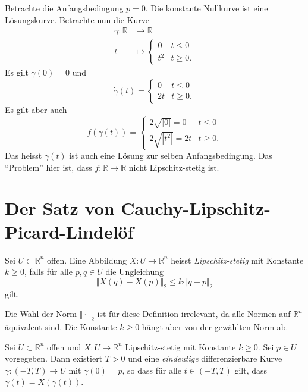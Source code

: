 \documentclass[../main.tex]{subfiles}
\begin{document}
\begin{examples}
\begin{enumerate}[(1)]
      Betrachte die Anfangsbedingung $p = 0$.
      Die konstante Nullkurve ist
      eine Lösungskurve.
      Betrachte nun die Kurve
      \begin{align*}
        \gamma \colon \mathbb{R} & \to \mathbb{R} \\
        t & \mapsto 
        \begin{cases}
          0 & t \leq 0 \\
          t^2 & t \geq 0.
        \end{cases}
      \end{align*}
      Es gilt $\gamma(0) = 0$ und
      \[
        \dot \gamma(t) =
        \begin{cases}
          0 & t \leq 0 \\
          2t & t \geq 0.
        \end{cases}
      \]
      Es gilt aber auch
      \[
        f(\gamma(t)) =
        \begin{cases}
          2 \sqrt{|0|} = 0 & t \leq 0 \\
          2 \sqrt{|t^2|} = 2t & t \geq 0.
        \end{cases}
      \]
      Das heisst $\gamma(t)$ ist auch eine Lösung
      zur selben Anfangsbedingung.
      Das ``Problem'' hier ist,
      dass $f \colon \mathbb{R} \to \mathbb{R}$ 
      nicht Lipschitz-stetig ist.
  \end{enumerate}
\end{examples}

\section{Der Satz von Cauchy-Lipschitz-Picard-Lindelöf}
\begin{definition}
  Sei $U \subset \mathbb{R}^n$ offen.
  Eine Abbildung $X \colon U \to \mathbb{R}^n$ 
  heisst \emph{Lipschitz-stetig} mit Konstante
  $k \geq 0$, falls für alle $p, q \in U$ 
  die Ungleichung
  \[
    \Vert X(q) - X(p) \Vert_2 \leq k \cdot \Vert q - p \Vert_2
  \]
  gilt.
\end{definition}

\begin{remark}
  Die Wahl der Norm $\Vert \cdot \Vert_2$ ist für diese
  Definition irrelevant,
  da alle Normen auf $\mathbb{R}^n$ äquivalent sind.
  Die Konstante $k \geq 0$ hängt aber von der gewählten
  Norm ab.
\end{remark}

\begin{theorem*}
  Sei $U \subset \mathbb{R}^n$ offen
  und $X \colon U \to \mathbb{R}^n$ Lipschitz-stetig
  mit Konstante $k \geq 0$.
  Sei $p \in U$ vorgegeben.
  Dann existiert $T > 0$ und eine \emph{eindeutige}
  differenzierbare Kurve
  $\gamma \colon (-T, T) \to U$ mit $\gamma(0) = p$,
  so dass für alle $t \in (-T, T)$ gilt, dass
  $\dot \gamma(t) = X(\gamma(t))$.
\end{theorem*}
\end{document}
